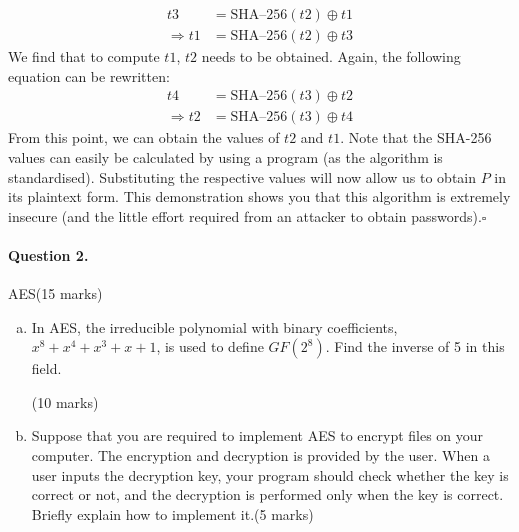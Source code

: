 \documentclass[12pt]{article}
\newcommand{\EOQ}{\hfill $\square$}
\begin{document}
\begin{enumerate}[(a)]
\begin{equation*}
\begin{split}
t3&=\text{SHA--256}(t2)\oplus t1\\
\Rightarrow t1&=\text{SHA--256}(t2)\oplus t3
\end{split}
\end{equation*}
We find that to compute $t1$, $t2$ needs to be obtained. Again, the following equation can be rewritten:
\begin{equation*}
\begin{split}
t4&=\text{SHA--256}(t3)\oplus t2\\
\Rightarrow t2&=\text{SHA--256}(t3)\oplus t4
\end{split}
\end{equation*}
From this point, we can obtain the values of $t2$ and $t1$. Note that the SHA-256 values can easily be calculated by using a program (as the algorithm is standardised). Substituting the respective values will now allow us to obtain $P$ in its plaintext form. This demonstration shows you that this algorithm is extremely insecure (and the little effort required from an attacker to obtain passwords).\EOQ
\end{enumerate}
\paragraph{Question 2.}   AES\hfill (15 marks)
\begin{enumerate}[(a)]
\item In AES, the irreducible polynomial with binary coefficients, $x^8+x^4+x^3+x+1$, is used to define $GF(2^8)$. Find the inverse of 5 in this field.{\vspace{-1.2em}\begin{flushright} (10 marks)\end{flushright}}
\item Suppose that you are required to implement AES to encrypt files on your computer. The encryption and decryption is provided by the user. When a user inputs the decryption key, your program should check whether the key is correct or not, and the decryption is performed only when the key is correct. Briefly explain how to implement it.\hfill (5 marks)
\end{enumerate}
\end{document}
